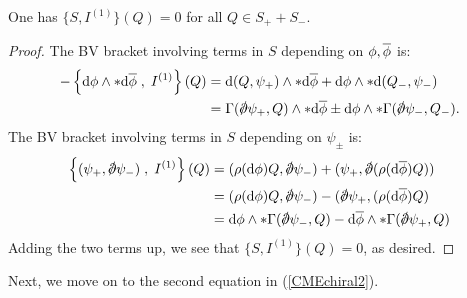 \documentclass[10pt, oneside]{article}
\begin{document}
\begin{lemma} 
One has $\{S, I^{(1)}\} (Q) = 0$ for all $Q \in S_+ + S_-$. 
\end{lemma}
\begin{proof}
The BV bracket involving terms in $S$ depending on $\phi,\Bar{\phi}$ is:
\begin{align*}
- \left\{\d \phi \wedge * \d \Bar{\phi} \; , \; I^{(1)} \right\}  (Q) & = \d (Q, \psi_+) \wedge * \d \Bar{\phi} + \d \phi \wedge * \d (Q_-, \psi_-) \\
& = \Gamma(\sd \dd \psi_+, Q) \wedge * \d \Bar{\phi} \pm \d \phi \wedge * \Gamma(\sd \dd \psi_-, Q_-) .
\end{align*}
The BV bracket involving terms in $S$ depending on $\psi_\pm$ is:
\begin{align*}
\left\{ (\psi_+ , \sd \dd \psi_-) \; , \; I^{(1)} \right\} (Q) & = (\rho(\d \phi) Q, \sd \dd \psi_-) + (\psi_+, \sd \dd (\rho(\d \Bar{\phi}) Q)) \\ & =  (\rho(\d \phi) Q, \sd \dd \psi_-) - (\sd \dd \psi_+, (\rho(\d \Bar{\phi}) Q) \\ & = \d \phi \wedge * \Gamma(\sd \dd \psi_-, Q) - \d \Bar{\phi} \wedge * \Gamma(\sd \dd \psi_+, Q)
\end{align*}
Adding the two terms up, we see that $\{S,I^{(1)}\}(Q) = 0$, as desired. 
\end{proof}

Next, we move on to the second equation in (\ref{CMEchiral2}). 
\end{document}

